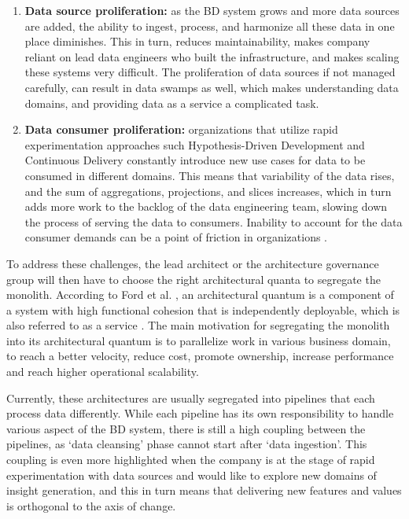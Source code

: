 \documentclass[review]{elsarticle}
\begin{document}
\begin{enumerate}
    \item \textbf{Data source proliferation:} as the BD system grows and more data sources are added, the ability to ingest, process, and harmonize all these data in one place diminishes. This in turn, reduces maintainability, makes company reliant on lead data engineers who built the infrastructure, and makes scaling these systems very difficult. The proliferation of data sources if not managed carefully, can result in data swamps as well, which makes understanding data domains, and providing data as a service a complicated task.
    \item \textbf{Data consumer proliferation:} organizations that utilize rapid experimentation approaches such Hypothesis-Driven Development and Continuous Delivery \cite{hypothesisDev} constantly introduce new use cases for data to be consumed in different domains. This means that variability of the data rises, and the sum of aggregations, projections, and slices increases, which in turn adds more work to the backlog of the data engineering team, slowing down the process of serving the data to consumers. Inability to account for the data consumer demands can be a point of friction in organizations \cite{monolithToMesh}. 
\end{enumerate}

To address these challenges, the lead architect or the architecture governance group will then have to choose the right architectural quanta to segregate the monolith. According to Ford et al. \cite{ford2017building}, an architectural quantum is a component of a system with high functional cohesion that is independently deployable, which is also referred to as a service \cite{newman2021building}. The main motivation for segregating the monolith into its architectural quantum is to parallelize work in various business domain, to reach a better velocity, reduce cost, promote ownership, increase performance and reach higher operational scalability.

Currently, these architectures are usually segregated into pipelines that each process data differently. While each pipeline has its own responsibility to handle various aspect of the BD system, there is still a high coupling between the pipelines, as `data cleansing' phase cannot start after `data ingestion'. This coupling is even more highlighted when the company is at the stage of rapid experimentation with data sources and would like to explore new domains of insight generation, and this in turn means that delivering new features and values is orthogonal to the axis of change.
\end{document}
